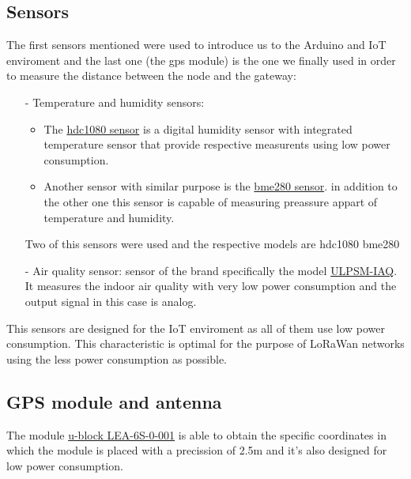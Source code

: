 \subsection{Sensors}
The first sensors mentioned were used to introduce us to the Arduino and IoT enviroment and the last one (the gps module)
is the one we finally used in order to measure the distance between the node and the gateway:
\begin{itemize}
    \item[-] Temperature and humidity sensors: 
        \begin{itemize}
        \item The \href{https://www.ti.com/lit/ds/symlink/hdc1080.pdf?ts=1655758883138&ref_url=https%253A%252F%252Fwww.google.com%252F}{hdc1080 sensor}
        is a digital humidity sensor with integrated temperature sensor that provide respective measurents using low power consumption.
        \item Another sensor with similar purpose is the \href{https://cdn-learn.adafruit.com/downloads/pdf/adafruit-bme280-humidity-barometric-pressure-temperature-sensor-breakout.pdf}{bme280 sensor}.
        in addition to the other one this sensor is capable of measuring preassure appart of temperature and humidity. 
        \end{itemize} 
        Two of this sensors were used and the respective models are hdc1080 bme280
    \item[-] Air quality sensor: sensor of the brand  specifically the model
    \href{https://www.spec-sensors.com/wp-content/uploads/2016/10/ULPSM-IAQ-968-008.pdf}{ULPSM-IAQ}. 
    It measures the indoor air quality   with very low power consumption and the output signal in this case is analog.

\end{itemize} 
This sensors are designed for the IoT enviroment as all of them use low power consumption. This characteristic is optimal 
for the purpose of LoRaWan networks using the less power consumption as possible. 

\subsection{GPS module and antenna}
The module \href{https://www.u-blox.com/en/product/lea-6-series}{u-block LEA-6S-0-001} 
is able to obtain the specific coordinates in which the module is placed with a precission of 2.5m and 
it's also designed for low power consumption. \\

